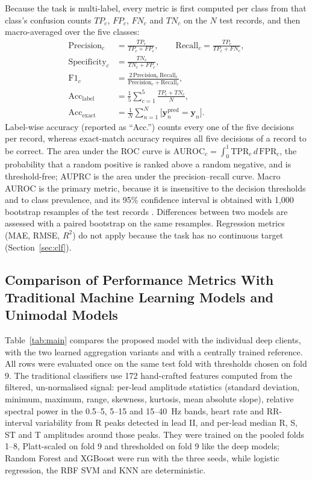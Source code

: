 Because the task is multi-label, every metric is first computed per class from that class's
confusion counts $TP_c$, $FP_c$, $FN_c$ and $TN_c$ on the $N$ test records, and then macro-averaged
over the five classes:
\begin{align}
\mathrm{Precision}_c &= \frac{TP_c}{TP_c+FP_c},\qquad \mathrm{Recall}_c = \frac{TP_c}{TP_c+FN_c},\\
\mathrm{Specificity}_c &= \frac{TN_c}{TN_c+FP_c},\\
\mathrm{F1}_c &= \frac{2\,\mathrm{Precision}_c\,\mathrm{Recall}_c}{\mathrm{Precision}_c+\mathrm{Recall}_c},\\
\mathrm{Acc}_{\text{label}} &= \frac{1}{5}\sum_{c=1}^{5}\frac{TP_c+TN_c}{N},\\
\mathrm{Acc}_{\text{exact}} &= \frac{1}{N}\sum_{n=1}^{N}\big[\mathbf y^{\mathrm{pred}}_n=\mathbf y_n\big].
\end{align}
Label-wise accuracy (reported as ``Acc.'') counts every one of the five decisions per record, whereas
exact-match accuracy requires all five decisions of a record to be correct. The area under the ROC
curve is $\mathrm{AUROC}_c=\int_0^1\mathrm{TPR}_c\,d\,\mathrm{FPR}_c$, the probability that a random
positive is ranked above a random negative, and is threshold-free; AUPRC is the area under the
precision--recall curve. Macro AUROC is the primary metric, because it is insensitive to the
decision thresholds and to class prevalence, and its 95\% confidence interval is obtained with 1,000
bootstrap resamples of the test records \cite{efron1993bootstrap}. Differences between two models are
assessed with a paired bootstrap on the same resamples. Regression metrics (MAE, RMSE, $R^2$) do not
apply because the task has no continuous target (Section~\ref{sec:clf}).

\subsection{Comparison of Performance Metrics With Traditional Machine Learning Models and Unimodal Models}
\label{sec:comparison}

Table~\ref{tab:main} compares the proposed model with the individual deep clients, with the two
learned aggregation variants and with a centrally trained reference. All rows were evaluated once
on the same test fold with thresholds chosen on fold 9. The traditional classifiers use 172
hand-crafted features computed from the filtered, un-normalised signal: per-lead amplitude statistics
(standard deviation, minimum, maximum, range, skewness, kurtosis, mean absolute slope), relative
spectral power in the 0.5--5, 5--15 and 15--40~Hz bands, heart rate and RR-interval variability from
R peaks detected in lead II, and per-lead median R, S, ST and T amplitudes around those peaks. They
were trained on the pooled folds 1--8, Platt-scaled on fold 9 and thresholded on fold 9 like the deep
models; Random Forest and XGBoost were run with the three seeds, while logistic regression, the RBF SVM
and KNN are deterministic.

